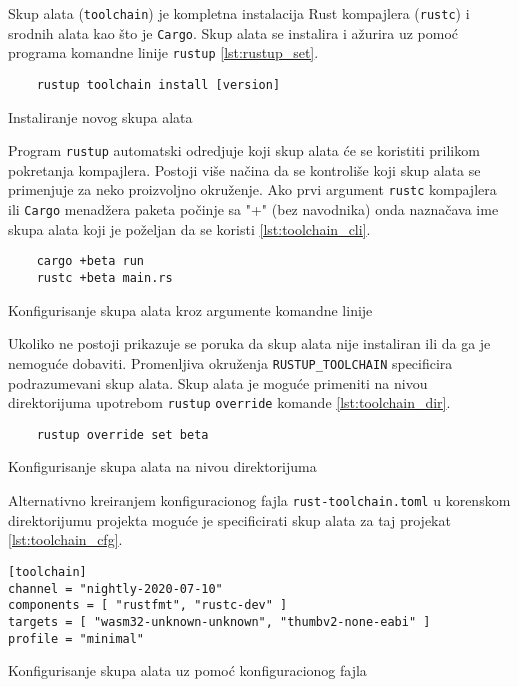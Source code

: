 Skup alata (\verb|toolchain|) je kompletna instalacija Rust kompajlera (\verb|rustc|) i srodnih alata kao što 
je \verb|Cargo|. Skup alata se instalira i ažurira uz pomoć programa komandne linije \verb|rustup| \ref{lst:rustup_set}. 

\begin{listing}[H]
\begin{verbatim}
    rustup toolchain install [version]
\end{verbatim}
\caption{Instaliranje novog skupa alata}
\label{lst:rustup_set}
\end{listing}

Program \verb|rustup| automatski odredjuje koji skup alata će se koristiti prilikom pokretanja kompajlera. 
Postoji više načina da se kontroliše koji skup alata se primenjuje za neko proizvoljno okruženje.
Ako prvi argument \verb|rustc| kompajlera ili \verb|Cargo| menadžera paketa počinje sa "+" (bez navodnika) 
onda naznačava ime skupa alata koji je poželjan da se koristi \ref{lst:toolchain_cli}. 

\begin{listing}[H]
\begin{verbatim}
    cargo +beta run 
    rustc +beta main.rs
\end{verbatim}
\caption{Konfigurisanje skupa alata kroz argumente komandne linije}
\label{lst:toolchain_cli}
\end{listing}

Ukoliko ne postoji prikazuje se poruka da skup 
alata nije instaliran ili da ga je nemoguće dobaviti. Promenljiva okruženja \verb|RUSTUP_TOOLCHAIN| specificira 
podrazumevani skup alata. Skup alata je moguće primeniti na nivou direktorijuma upotrebom \verb|rustup| \verb|override|
komande \ref{lst:toolchain_dir}. 

\begin{listing}[H]
\begin{verbatim}
    rustup override set beta 
\end{verbatim}
\caption{Konfigurisanje skupa alata na nivou direktorijuma}
\label{lst:toolchain_dir}
\end{listing}

Alternativno kreiranjem konfiguracionog fajla \verb|rust-toolchain.toml| u korenskom 
direktorijumu projekta moguće je specificirati skup alata za taj projekat \ref{lst:toolchain_cfg}.

\begin{listing}[H]
\begin{verbatim}
[toolchain]
channel = "nightly-2020-07-10"
components = [ "rustfmt", "rustc-dev" ]
targets = [ "wasm32-unknown-unknown", "thumbv2-none-eabi" ]
profile = "minimal"
\end{verbatim}
\caption{Konfigurisanje skupa alata uz pomoć konfiguracionog fajla}
\label{lst:toolchain_cfg}
\end{listing}

